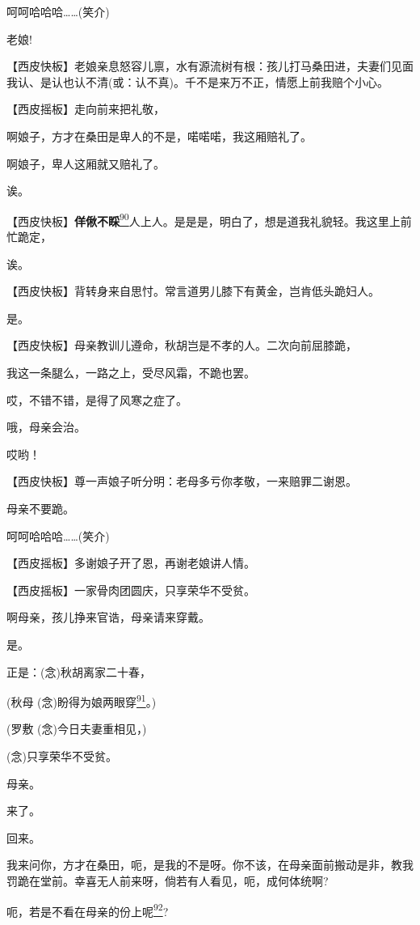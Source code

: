 呵呵哈哈哈\ldots{}\ldots{}(笑介)

老娘!

【西皮快板】老娘亲息怒容儿禀，水有源流树有根：孩儿打马桑田进，夫妻们见面我认、是认也认不清(或：认不真)。千不是来万不正，情愿上前我赔个小心。

【西皮摇板】走向前来把礼敬，

啊娘子，方才在桑田是卑人的不是，喏喏喏，我这厢赔礼了。

啊娘子，卑人这厢就又赔礼了。

诶。

【西皮快板】\textbf{佯偢不睬}\protect\hyperlink{fn90}{\textsuperscript{90}}人上人。是是是，明白了，想是道我礼貌轻。我这里上前忙跪定，

诶。

【西皮快板】背转身来自思忖。常言道男儿膝下有黄金，岂肯低头跪妇人。

是。

【西皮快板】母亲教训儿遵命，秋胡岂是不孝的人。二次向前屈膝跪，

我这一条腿么，一路之上，受尽风霜，不跪也罢。

哎，不错不错，是得了风寒之症了。

哦，母亲会治。

哎哟！

【西皮快板】尊一声娘子听分明：老母多亏你孝敬，一来赔罪二谢恩。

母亲不要跪。

呵呵哈哈哈\ldots{}\ldots{}(笑介)

【西皮摇板】多谢娘子开了恩，再谢老娘讲人情。

【西皮摇板】一家骨肉团圆庆，只享荣华不受贫。

啊母亲，孩儿挣来官诰，母亲请来穿戴。

是。

正是：(念)秋胡离家二十春，

(秋母
(念)盼得为娘两眼穿\protect\hyperlink{fn91}{\textsuperscript{91}}。)

(罗敷 (念)今日夫妻重相见，)

(念)只享荣华不受贫。

母亲。

来了。

回来。

我来问你，方才在桑田，呃，是我的不是呀。你不该，在母亲面前搬动是非，教我罚跪在堂前。幸喜无人前来呀，倘若有人看见，呃，成何体统啊?

呃，若是不看在母亲的份上呢\protect\hyperlink{fn92}{\textsuperscript{92}}?

